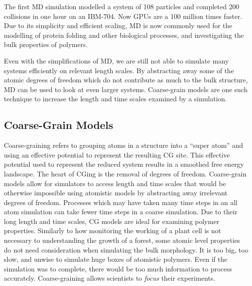 The first MD simulation modelled a system of 108 particles and completed 200 collisions in one hour on an IBM-704\cite{Alder1957}.
Now GPUs are a 100 million times faster.
Due to its simplicity and efficient scaling, MD is now commonly used for the modelling of protein folding\cite{levitt75} and other biological processes, and investigating the bulk properties of polymers\cite{Gartner2019a}.


Even with the simplifications of MD, we are still not able to simulate many systems efficiently on relevant length scales.
By abstracting away some of the atomic degrees of freedom which do not contribute as much to the bulk structure, MD can be used to look at even larger systems.
Coarse-grain models are one such technique to increase the length and time scales examined by a simulation.

\subsection*{Coarse-Grain Models}

Coarse-graining refers to grouping atoms in a structure into a ``super atom'' and using an effective potential to represent the resulting CG site.
This effective potential used to represent the reduced system results in a smoothed free energy landscape. 
The heart of CGing is the removal of degrees of freedom. 
Coarse-grain models allow for simulators to access length and time scales that would be otherwise impossible using atomistic models by abstracting away irrelevant degrees of freedom.
Processes which may have taken many time steps in an all atom simulation can take fewer time steps in a coarse simulation\cite{Berendsen2010}.
Due to their long length and time scales, CG models are ideal for examining polymer properties\cite{Gartner2019a}.
Similarly to how monitoring the working of a plant cell is not necessary to understanding the growth of a forest, some atomic level properties do not need consideration when simulating the bulk morphology\cite{Muller-Plathe2002}.
It is too big, too slow, and unwise to simulate huge boxes of atomistic polymers.
Even if the simulation was to complete, there would be too much information to process accurately. 
Coarse-graining allows scientists to \textit{focus} their experiments\cite{Baschnagel2000}.

